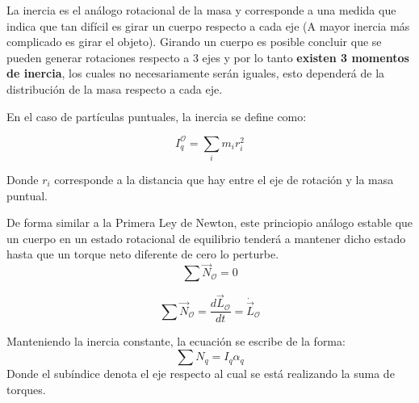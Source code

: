 \documentclass[/home/hernan/Documentos/Apuntes_mecanica_teorica/main.tex]{subfiles}
\begin{document}

	\begin{definition}
		La inercia es el análogo rotacional de la masa y corresponde a una medida que indica que tan difícil es girar un cuerpo respecto a cada eje (A mayor inercia más complicado es girar el objeto). Girando un cuerpo es posible concluir que se pueden generar rotaciones respecto a 3 ejes y por lo tanto \textbf{existen 3 momentos de inercia}, los cuales no necesariamente serán iguales, esto dependerá de la distribución de la masa respecto a cada eje.

		En el caso de partículas puntuales, la inercia se define como:
		
		\begin{equation}
			I_{q}^{\mathcal{O}} = \sum_{i} m_{i} r^{2}_{i}
			\label{eq: easyinercia}
		\end{equation}

		Donde $r_{i}$ corresponde a la distancia que hay entre el eje de rotación y la masa puntual.

	\end{definition}


	\begin{definition}
		De forma similar a la Primera Ley de Newton, este princiopio análogo estable que un cuerpo en un estado rotacional de equilibrio tenderá a mantener dicho estado hasta que un torque neto diferente de cero lo perturbe.
		\begin{equation}
			\sum \vec{N}_{\mathcal{O}} = 0
			\label{eq: Nfirstlawrot}
		\end{equation}
		
	\end{definition}

	\begin{definition}
		\begin{equation}
			\sum \vec{N}_{\mathcal{O}} = \frac{d \vec{L}_{\mathcal{O}}}{dt} = \dot{\vec{L}}_{\mathcal{O}}
			\label{eq: NSecondlawrot}
		\end{equation}

		Manteniendo la inercia constante, la ecuación se escribe de la forma:
		\begin{equation}
			\sum N_{q} = I_{q} \alpha_{q}
		\end{equation}
		Donde el subíndice denota el eje respecto al cual se está realizando la suma de torques.
	\end{definition}
\end{document}
